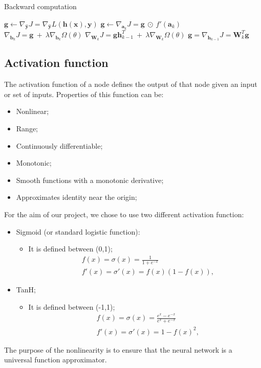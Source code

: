 \begin{algorithm}[H]
	\caption{Backward computation}
	\label{alg:bp}
	\begin{algorithmic}[2]
		\State $\mathbf{g} \leftarrow \nabla_{\hat{\mathbf{y}}}J = \nabla_{\hat{\mathbf{y}}}
		L(\mathbf{h(x)}, \mathbf{y})$
		\State $\mathbf{g} \leftarrow \nabla_{\mathbf{a}_{k}}J = \mathbf{g} \ \odot \
		f'(\mathbf{a}_{k})$
		\State $\nabla_{\mathbf{b}_{k}}J = \mathbf{g} \ + \ \lambda \nabla_{\mathbf{b}_{k}}
		\Omega(\theta)$
		\State $\nabla_{\mathbf{W}_{k}}J = \mathbf{g}\mathbf{h}_{k - 1}^{T} \ + \ \lambda
		\nabla_{\mathbf{W}_{k}} \Omega(\theta)$
		\State $\mathbf{g} = \nabla_{\mathbf{h}_{k - 1}}J = \mathbf{W}_{k}^{T}\mathbf{g}$
		\EndFor
		\EndProcedure
	\end{algorithmic}
\end{algorithm}
\subsection{Activation function}
\label{activationFunction}
The activation function of a node defines the output of that node given an input or set of inputs. 
Properties of this function can be:
\begin{itemize}
	\item Nonlinear;
	\item Range;
	\item Continuously differentiable;
	\item Monotonic;
	\item Smooth functions with a monotonic derivative;
	\item Approximates identity near the origin;
\end{itemize}

For the aim of our project, we chose to use two different activation function:
\begin{itemize}
	\label{sigmoid}
	\item Sigmoid (or standard logistic function):
	\begin{itemize}
		\item It is defined between (0,1); 		
			\begin{align*}
			&f(x) = \sigma(x) = \frac{1}{1 + e^{-x}} \\
			&f'(x) = \sigma'(x) = f(x)(1 - f(x)),
			\end{align*} 
	\end{itemize}
	\item TanH;
	\label{tanH}
	\begin{itemize}
		\item It is defined between (-1,1); 		
		\begin{align*}
		&f(x) = \sigma(x) = \frac{e^{x}-e^{-x}}{e^{x} + e^{-x}} \\
		&f'(x) = \sigma'(x) = 1 - f(x)^{2},
		\end{align*} 
	\end{itemize}
\end{itemize}
The purpose of the nonlinearity is to ensure that the neural network is a universal function approximator.
